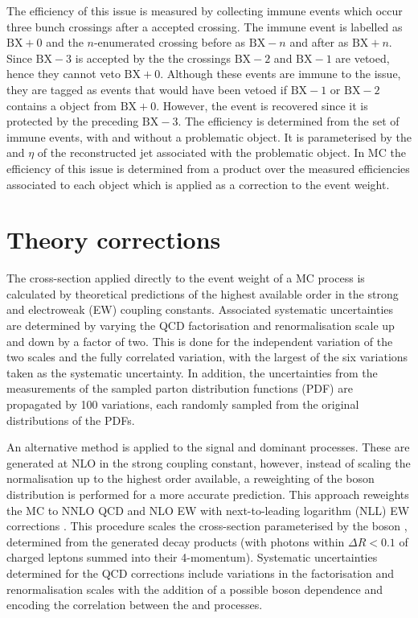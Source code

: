 The efficiency of this issue is measured by collecting immune events which occur three bunch crossings after a \HWT accepted crossing. The immune event is labelled as $\mathrm{BX}+0$ and the $n$-enumerated crossing before as $\mathrm{BX}-n$ and after as $\mathrm{BX}+n$. Since $\mathrm{BX}-3$ is accepted by the \HWT the crossings $\mathrm{BX}-2$ and $\mathrm{BX}-1$ are vetoed, hence they cannot veto $\mathrm{BX}+0$. Although these events are immune to the issue, they are tagged as events that would have been vetoed if $\mathrm{BX}-1$ or $\mathrm{BX}-2$ contains a \HWT object from $\mathrm{BX}+0$. However, the event is recovered since it is protected by the preceding $\mathrm{BX}-3$. The efficiency is determined from the set of immune events, with and without a problematic \HWT object. It is parameterised by the \pt and $\eta$ of the reconstructed jet associated with the problematic \HWT object. In MC the efficiency of this issue is determined from a product over the measured efficiencies associated to each object which is applied as a correction to the event weight.


\section{Theory corrections}\label{sec:theory-corrections}

The cross-section applied directly to the event weight of a MC process is calculated by theoretical predictions of the highest available order in the strong and electroweak (EW) coupling constants. Associated systematic uncertainties are determined by varying the QCD factorisation and renormalisation scale up and down by a factor of two. This is done for the independent variation of the two scales and the fully correlated variation, with the largest of the six variations taken as the systematic uncertainty. In addition, the uncertainties from the measurements of the sampled \NNPDF parton distribution functions (PDF) \cite{Ball:2014uwa} are propagated by 100 variations, each randomly sampled from the original distributions of the PDFs.

An alternative method is applied to the signal and dominant \IVj processes.  These are generated at NLO in the strong coupling constant, however, instead of scaling the normalisation up to the highest order available, a reweighting of the boson \pt distribution is performed for a more accurate prediction.  This approach reweights the MC to NNLO QCD and NLO EW with next-to-leading logarithm (NLL) EW corrections \cite{Lindert:2017olm}. This procedure scales the cross-section parameterised by the boson \pt, determined from the generated decay products (with photons within ${\Delta R<0.1}$ of charged leptons summed into their 4-momentum). Systematic uncertainties determined for the QCD corrections include variations in the factorisation and renormalisation scales with the addition of a possible boson \pt dependence and encoding the correlation between the \IZj and \IWj processes.

